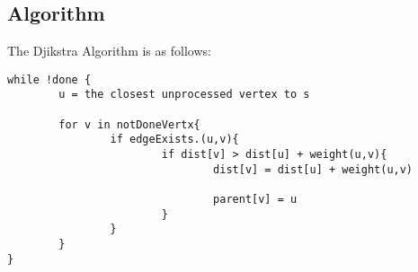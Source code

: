 \documentclass[12pt]{book}
\begin{document}
\subsection*{Algorithm}
The Djikstra Algorithm is as follows:
\begin{verbatim}
while !done {
        u = the closest unprocessed vertex to s

        for v in notDoneVertx{
                if edgeExists.(u,v){
                        if dist[v] > dist[u] + weight(u,v){
                                dist[v] = dist[u] + weight(u,v)

                                parent[v] = u
                        }
                }
        }
}

\end{verbatim}
\end{document}
